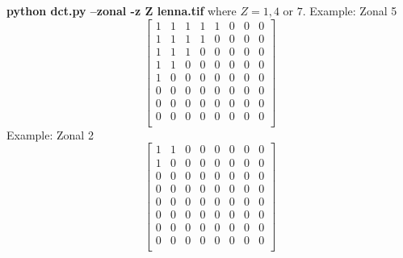 \textbf{python dct.py --zonal -z Z lenna.tif} where $Z = 1, 4$ or $7$.
\newline
\newline
Example: Zonal 5
\begin{equation}
\begin{bmatrix}
       1 & 1 & 1 & 1 & 1 & 0 & 0 & 0 \\
       1 & 1 & 1 & 1 & 0 & 0 & 0 & 0 \\
       1 & 1 & 1 & 0 & 0 & 0 & 0 & 0 \\
       1 & 1 & 0 & 0 & 0 & 0 & 0 & 0 \\
       1 & 0 & 0 & 0 & 0 & 0 & 0 & 0 \\
       0 & 0 & 0 & 0 & 0 & 0 & 0 & 0 \\
       0 & 0 & 0 & 0 & 0 & 0 & 0 & 0 \\
       0 & 0 & 0 & 0 & 0 & 0 & 0 & 0 \\
\end{bmatrix}
\end{equation}
\bigskip
Example: Zonal 2
\begin{equation}
\begin{bmatrix}
       1 & 1 & 0 & 0 & 0 & 0 & 0 & 0 \\
       1 & 0 & 0 & 0 & 0 & 0 & 0 & 0 \\
       0 & 0 & 0 & 0 & 0 & 0 & 0 & 0 \\
       0 & 0 & 0 & 0 & 0 & 0 & 0 & 0 \\
       0 & 0 & 0 & 0 & 0 & 0 & 0 & 0 \\
       0 & 0 & 0 & 0 & 0 & 0 & 0 & 0 \\
       0 & 0 & 0 & 0 & 0 & 0 & 0 & 0 \\
       0 & 0 & 0 & 0 & 0 & 0 & 0 & 0 \\
\end{bmatrix}
\end{equation}

